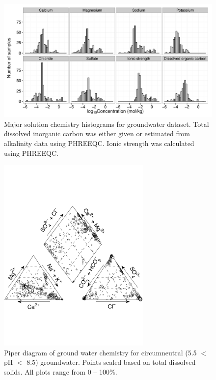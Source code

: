 \begin{figure}[htbp]
\begin{center}
\includegraphics[width=\textwidth]{Ch3_figures/GW-chem-hist.pdf}
\caption{Major solution chemistry histograms for groundwater dataset. Total dissolved inorganic carbon was either given or estimated from alkalinity data using PHREEQC. Ionic strength was calculated using PHREEQC.}\label{fig:GW-chem-hist}
\end{center}
\end{figure}

\begin{figure}[htbp]
\begin{center}
\includegraphics[width=0.67\textwidth]{Ch3_figures/GW-piper.pdf}
\caption{Piper diagram of ground water chemistry for circumneutral (5.5 $<$ pH $<$ 8.5) groundwater. Points scaled based on total dissolved solids. All plots range from 0 -- 100\%.}\label{fig:GW-chem-piper}
\end{center}
\end{figure}

